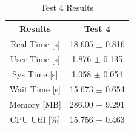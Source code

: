 \documentclass{article}
\begin{document}
\begin{table}[h!]
    \centering
    \begin{tabular}{cc}
        \hline
        \textbf{Results} & Test 4               \\ \hline
        Real Time [s]    &  18.605 $\pm$ 0.816  \\
        User Time [s]    &  1.876 $\pm$ 0.135   \\
        Sys Time [s]     &  1.058 $\pm$ 0.054   \\
        Wait Time [s]    &  15.673 $\pm$ 0.654  \\
        Memory [MB]      &  286.00 $\pm$ 9.291  \\
        CPU Util [\%]    &  15.756 $\pm$ 0.463  \\
        \hline
    \end{tabular}
    \caption{Test 4 Results}
    \label{tab:T4_Results}
\end{table}

\break
\end{document}
